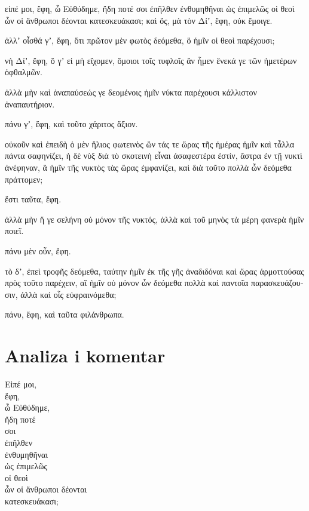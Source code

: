 {\large

\begin{greek}

\noindent εἰπέ μοι, ἔφη, ὦ Εὐθύδημε, ἤδη ποτέ σοι ἐπῆλθεν ἐνθυμηθῆναι ὡς ἐπιμελῶς οἱ θεοὶ ὧν οἱ ἄνθρωποι δέονται κατεσκευάκασι; καὶ ὅς, μὰ τὸν Δίʼ, ἔφη, οὐκ ἔμοιγε. 

ἀλλʼ οἶσθά γʼ, ἔφη, ὅτι πρῶτον μὲν φωτὸς δεόμεθα, ὃ ἡμῖν οἱ θεοὶ παρέχουσι; 

νὴ Δίʼ, ἔφη, ὅ γʼ εἰ μὴ εἴχομεν, ὅμοιοι τοῖς τυφλοῖς ἂν ἦμεν ἕνεκά γε τῶν ἡμετέρων ὀφθαλμῶν. 

ἀλλὰ μὴν καὶ ἀναπαύσεώς γε δεομένοις ἡμῖν νύκτα παρέχουσι κάλλιστον ἀναπαυτήριον.

πάνυ γʼ, ἔφη, καὶ τοῦτο χάριτος ἄξιον. 

οὐκοῦν καὶ ἐπειδὴ ὁ μὲν ἥλιος φωτεινὸς ὢν τάς τε ὥρας τῆς ἡμέρας ἡμῖν καὶ τἆλλα πάντα σαφηνίζει, ἡ δὲ νὺξ διὰ τὸ σκοτεινὴ εἶναι ἀσαφεστέρα ἐστίν, ἄστρα ἐν τῇ νυκτὶ ἀνέφηναν, ἃ ἡμῖν τῆς νυκτὸς τὰς ὥρας ἐμφανίζει, καὶ διὰ τοῦτο πολλὰ ὧν δεόμεθα πράττομεν; 

ἔστι ταῦτα, ἔφη. 

ἀλλὰ μὴν ἥ γε σελήνη οὐ μόνον τῆς νυκτός, ἀλλὰ καὶ τοῦ μηνὸς τὰ μέρη φανερὰ ἡμῖν ποιεῖ.

πάνυ μὲν οὖν, ἔφη. 

τὸ δʼ, ἐπεὶ τροφῆς δεόμεθα, ταύτην ἡμῖν ἐκ τῆς γῆς ἀναδιδόναι καὶ ὥρας ἁρμοττούσας πρὸς τοῦτο παρέχειν, αἳ ἡμῖν οὐ μόνον ὧν δεόμεθα πολλὰ καὶ παντοῖα παρασκευάζουσιν, ἀλλὰ καὶ οἷς εὐφραινόμεθα;

πάνυ, ἔφη, καὶ ταῦτα φιλάνθρωπα.

\end{greek}

}


\section*{Analiza i komentar}



{\large
\begin{greek}
\noindent Εἰπέ μοι, \\
\tabto{2em} ἔφη, \\
ὦ Εὐθύδημε, \\
\tabto{2em} ἤδη ποτέ \\
\tabto{2em} σοι \\
\tabto{2em} ἐπῆλθεν \\
\tabto{4em} ἐνθυμηθῆναι \\
\tabto{6em} ὡς ἐπιμελῶς \\
\tabto{6em} οἱ θεοὶ \\
\tabto{8em} ὧν οἱ ἄνθρωποι δέονται \\
\tabto{6em} κατεσκευάκασι;\\

\end{greek}
}

